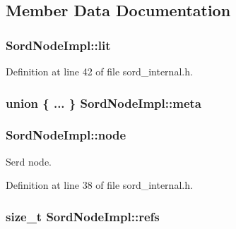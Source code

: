 \subsection{Member Data Documentation}
\subsubsection[{\texorpdfstring{lit}{lit}}]{ Sord\+Node\+Impl\+::lit}\hypertarget{struct_sord_node_impl_a2b1bab2646fb3e4a17b24cb926df7884}{}\label{struct_sord_node_impl_a2b1bab2646fb3e4a17b24cb926df7884}


Definition at line 42 of file sord\+\_\+internal.\+h.

\subsubsection[{\texorpdfstring{meta}{meta}}]{\setlength{\rightskip}{0pt plus 5cm}union \{ ... \}   Sord\+Node\+Impl\+::meta}\hypertarget{struct_sord_node_impl_aabe7dd54ba242842ab3f0b3bc307c093}{}\label{struct_sord_node_impl_aabe7dd54ba242842ab3f0b3bc307c093}
\subsubsection[{\texorpdfstring{node}{node}}]{ Sord\+Node\+Impl\+::node}\hypertarget{struct_sord_node_impl_a92cfbbb49866b131b39ef8ac8b47a344}{}\label{struct_sord_node_impl_a92cfbbb49866b131b39ef8ac8b47a344}


Serd node. 



Definition at line 38 of file sord\+\_\+internal.\+h.

\subsubsection[{\texorpdfstring{refs}{refs}}]{\setlength{\rightskip}{0pt plus 5cm}size\+\_\+t Sord\+Node\+Impl\+::refs}\hypertarget{struct_sord_node_impl_ab08e121f0b247be9521510a88ad56a9f}{}\label{struct_sord_node_impl_ab08e121f0b247be9521510a88ad56a9f}


